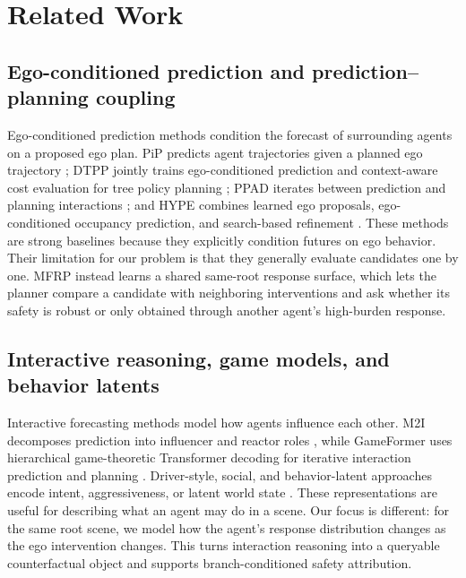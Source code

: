 \documentclass[10pt]{article}
\newcommand{\framework}{MFRP}
\begin{document}
\section{Related Work}

\subsection{Ego-conditioned prediction and prediction--planning coupling}
Ego-conditioned prediction methods condition the forecast of surrounding agents on a proposed ego plan. PiP predicts agent trajectories given a planned ego trajectory \parencite{song2020pip}; DTPP jointly trains ego-conditioned prediction and context-aware cost evaluation for tree policy planning \parencite{huang2024dtpp}; PPAD iterates between prediction and planning interactions \parencite{chen2024ppad}; and HYPE combines learned ego proposals, ego-conditioned occupancy prediction, and search-based refinement \parencite{yu2025hype}. These methods are strong baselines because they explicitly condition futures on ego behavior. Their limitation for our problem is that they generally evaluate candidates one by one. \framework{} instead learns a shared same-root response surface, which lets the planner compare a candidate with neighboring interventions and ask whether its safety is robust or only obtained through another agent's high-burden response.

\subsection{Interactive reasoning, game models, and behavior latents}
Interactive forecasting methods model how agents influence each other. M2I decomposes prediction into influencer and reactor roles \parencite{sun2022m2i}, while GameFormer uses hierarchical game-theoretic Transformer decoding for iterative interaction prediction and planning \parencite{huang2023gameformer}. Driver-style, social, and behavior-latent approaches encode intent, aggressiveness, or latent world state \parencite{hu2023formulating,chen2025categorical,deng2025social,hao2026styledrive,zheng2025world4drive}. These representations are useful for describing what an agent may do in a scene. Our focus is different: for the same root scene, we model how the agent's response distribution changes as the ego intervention changes. This turns interaction reasoning into a queryable counterfactual object and supports branch-conditioned safety attribution.
\end{document}

